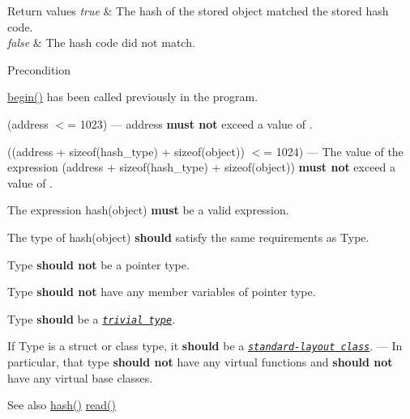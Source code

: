 \begin{DoxyRetVals}{Return values}
{\em true} & The hash of the stored object matched the stored hash code. \\
\hline
{\em false} & The hash code did not match.\\
\hline
\end{DoxyRetVals}
\begin{DoxyPrecond}{Precondition}
\begin{DoxyItemize}
\item {\ttfamily \mbox{\hyperlink{classArduboy2EEPROM_a4d482ef8e8204c56a0feba68791bc0c8}{begin()}}} has been called previously in the program. \item {\ttfamily (address $<$= 1023)} --- {\ttfamily address} {\bfseries{must not}} exceed a value of {}. \item {\ttfamily ((address + sizeof(hash\+\_\+type) + sizeof(object)) $<$= 1024)} --- The value of the expression {\ttfamily (address + sizeof(hash\+\_\+type) + sizeof(object))} {\bfseries{must not}} exceed a value of {}. \item The expression {\ttfamily hash(object)} {\bfseries{must}} be a valid expression. \item The type of {\ttfamily hash(object)} {\bfseries{should}} satisfy the same requirements as {\ttfamily Type}. \item {\ttfamily Type} {\bfseries{should not}} be a pointer type. \item {\ttfamily Type} {\bfseries{should not}} have any member variables of pointer type. \item {\ttfamily Type} {\bfseries{should}} be a \href{https://en.cppreference.com/w/cpp/named_req/TrivialType}{\texttt{ {\itshape trivial type}}}. \item If {\ttfamily Type} is a {\ttfamily struct} or {\ttfamily class} type, it {\bfseries{should}} be a \href{https://en.cppreference.com/w/cpp/language/classes\#Standard-layout_class}{\texttt{ {\itshape standard-\/layout class}}}. --- In particular, that type {\bfseries{should not}} have any {\ttfamily virtual} functions and {\bfseries{should not}} have any {\ttfamily virtual} base classes.\end{DoxyItemize}

\end{DoxyPrecond}
\begin{DoxySeeAlso}{See also}
\mbox{\hyperlink{classArduboy2EEPROM_a0d81ac363020a75a0b56af7eb014f5b4}{hash()}} \mbox{\hyperlink{classArduboy2EEPROM_a6e9b09f0b94295c040204ca0cb674649}{read()}} 
\end{DoxySeeAlso}


